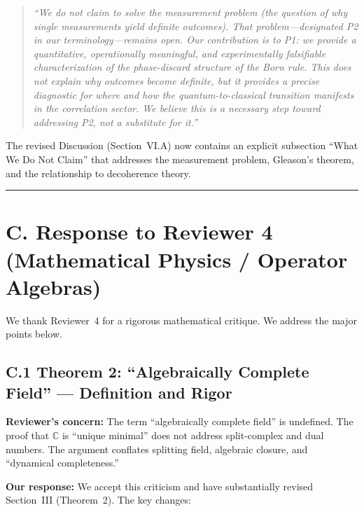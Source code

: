 \documentclass[11pt,a4paper]{article}
\begin{document}
\begin{quote}
\emph{``We do not claim to solve the measurement problem (the question of why single measurements yield definite outcomes). That problem---designated P2 in our terminology---remains open. Our contribution is to P1: we provide a quantitative, operationally meaningful, and experimentally falsifiable characterization of the phase-discard structure of the Born rule. This does not explain why outcomes become definite, but it provides a precise diagnostic for where and how the quantum-to-classical transition manifests in the correlation sector. We believe this is a necessary step toward addressing P2, not a substitute for it.''}
\end{quote}

The revised Discussion (Section~VI.A) now contains an explicit subsection ``What We Do Not Claim'' that addresses the measurement problem, Gleason's theorem, and the relationship to decoherence theory.

\vspace{1em}
\hrule
\vspace{1em}

\section*{C. Response to Reviewer 4 (Mathematical Physics / Operator Algebras)}

We thank Reviewer~4 for a rigorous mathematical critique. We address the major points below.

\subsection*{C.1 Theorem 2: ``Algebraically Complete Field'' --- Definition and Rigor}

\textbf{Reviewer's concern:} The term ``algebraically complete field'' is undefined. The proof that $\mathbb{C}$ is ``unique minimal'' does not address split-complex and dual numbers. The argument conflates splitting field, algebraic closure, and ``dynamical completeness.''

\textbf{Our response:} We accept this criticism and have substantially revised Section~III (Theorem~2). The key changes:
\end{document}
